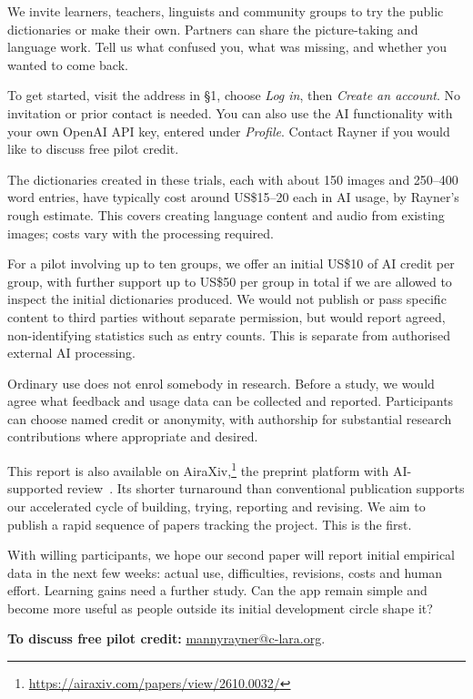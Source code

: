 \documentclass[11pt,a4paper]{article}
\newcommand{\topic}[1]{\vspace{6pt}{\large\bfseries\color{accent}#1\par}\vspace{2pt}}
\begin{document}
\topic{6. An invitation to help shape the next version}
We invite learners, teachers, linguists and community groups to try the public
dictionaries or make their own. Partners can share the picture-taking and
language work. Tell us what confused you, what was missing, and whether you
wanted to come back.

To get started, visit the address in \S1, choose \emph{Log in}, then
\emph{Create an account}. No invitation or prior contact is needed. You can also
use the AI functionality with your own OpenAI API key, entered under
\emph{Profile}. Contact Rayner if you would like to discuss free pilot credit.

The dictionaries created in these trials, each with about 150 images and
250--400 word entries, have typically cost around US\$15--20 each in AI usage,
by Rayner's rough estimate. This covers creating language content and audio from
existing images; costs vary with the processing required.

For a pilot involving up to ten groups, we offer an initial US\$10 of AI credit
per group, with further support up to US\$50 per group in total if we are allowed
to inspect the initial dictionaries produced.
We would not publish or pass specific content to third parties without separate
permission, but would report agreed, non-identifying statistics such as entry
counts. This is separate from authorised external AI processing.

Ordinary use does not enrol somebody in research. Before a study, we would agree
what feedback and usage data can be collected and reported. Participants can
choose named credit or anonymity, with authorship for substantial research
contributions where appropriate and desired.

This report is also available on AiraXiv,\footnote{\url{https://airaxiv.com/papers/view/2610.0032/}}
the preprint platform with AI-supported review~\cite{airaxiv}. Its shorter turnaround than conventional
publication supports our accelerated cycle of building, trying, reporting and
revising. We aim to publish a rapid sequence of papers tracking the project.
This is the first.

With willing participants, we hope our second paper will report initial empirical
data in the next few weeks: actual use, difficulties, revisions, costs and human effort. Learning
gains need a further study. Can the app remain simple and become more useful as
people outside its initial development circle shape it?

\textbf{To discuss free pilot credit:}
\href{mailto:mannyrayner@c-lara.org}{mannyrayner@c-lara.org}.
\end{document}
